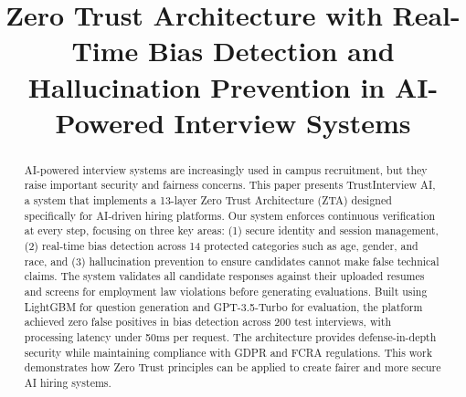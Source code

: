 \documentclass[conference]{IEEEtran}
\begin{document}
\title{Zero Trust Architecture with Real-Time Bias Detection and Hallucination Prevention in AI-Powered Interview Systems}

\author{%
\and
{}
\and
{}
\and
{}
}


\maketitle

\begin{abstract}
AI-powered interview systems are increasingly used in campus recruitment, but they raise important security and fairness concerns. This paper presents TrustInterview AI, a system that implements a 13-layer Zero Trust Architecture (ZTA) designed specifically for AI-driven hiring platforms. Our system enforces continuous verification at every step, focusing on three key areas: (1) secure identity and session management, (2) real-time bias detection across 14 protected categories such as age, gender, and race, and (3) hallucination prevention to ensure candidates cannot make false technical claims. The system validates all candidate responses against their uploaded resumes and screens for employment law violations before generating evaluations. Built using LightGBM for question generation and GPT-3.5-Turbo for evaluation, the platform achieved zero false positives in bias detection across 200 test interviews, with processing latency under 50ms per request. The architecture provides defense-in-depth security while maintaining compliance with GDPR and FCRA regulations. This work demonstrates how Zero Trust principles can be applied to create fairer and more secure AI hiring systems.
\end{abstract}
\end{document}
